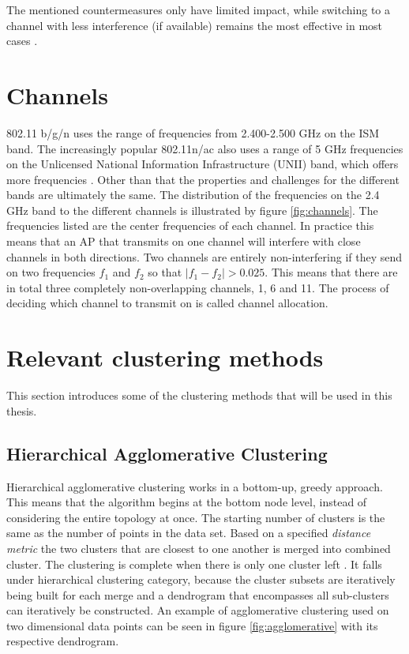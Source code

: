 \begin{figure}
	\end{figure}


	The mentioned countermeasures only have limited
	impact, while switching to a channel with less interference (if available) remains the most effective in most cases \cite{impactRF}. 
	\section{Channels} 
	802.11 b/g/n uses the range of frequencies from 2.400-2.500 GHz on the ISM band.
	The increasingly popular 802.11n/ac also uses a range of 5 GHz frequencies on the Unlicensed
	National Information Infrastructure (UNII) band, which offers more frequencies \cite{5ghz}.
	Other than that the properties and challenges for the different bands are ultimately the same.
	The distribution of the frequencies on the 2.4 GHz band to the different channels is illustrated by figure \ref{fig:channels}. The frequencies listed are the center frequencies of each channel. In practice this means that an AP that transmits on one channel will interfere with close channels in both directions. Two channels are entirely non-interfering if they send on two frequencies  $f_{1}$ and $f_{2}$ so that $|f_{1} - f_{2}| > 0.025$. This means that there are in total three completely non-overlapping channels, 1, 6 and 11. The process of deciding which channel to transmit on is called channel allocation. 


\section{Relevant clustering methods}
This section introduces some of the clustering methods that will be used in this thesis.

\subsection {Hierarchical Agglomerative Clustering}
Hierarchical agglomerative clustering works in a bottom-up, greedy approach. This means that the algorithm
begins at the bottom node level, instead of considering the entire topology at once.
The starting number of clusters is the same as the number of points in the data set. Based on a specified \textit{distance metric} the two clusters that are closest to one another is merged into combined cluster. The clustering is complete
when there is only one cluster left \cite{murtycluster}. It falls under hierarchical clustering category, because the cluster subsets are iteratively being built for each merge and a dendrogram
that encompasses all sub-clusters can iteratively be constructed. An example of agglomerative clustering used on two dimensional data points can be seen in figure \ref{fig:agglomerative}
with its respective dendrogram. 

